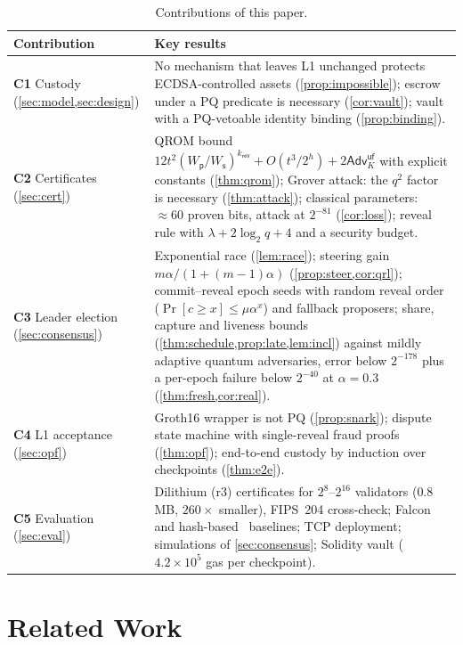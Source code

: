 \documentclass[10pt,journal,compsoc]{IEEEtran}
\theoremstyle{tplain}
\theoremstyle{tdef}
\theoremstyle{remark}
\newcommand{\Adv}{\mathsf{Adv}}
\newcommand{\Ws}{W_{\mathsf{s}}}
\newcommand{\Wp}{W_{\mathsf{p}}}
\newcommand{\kr}{k_{\mathsf{rev}}}
\begin{document}
\begin{table}[t]
\centering
\caption{Contributions of this paper.}
\label{tab:contrib}
\scriptsize
\setlength{\tabcolsep}{2.5pt}
\renewcommand{\arraystretch}{1.25}
\begin{tabular}{@{}>{\raggedright\arraybackslash}p{}>{\raggedright\arraybackslash}p{}@{}}
\toprule
Contribution & Key results\\
\midrule
\textbf{C1} Custody (\cref{sec:model,sec:design}) & No mechanism that leaves L1 unchanged protects ECDSA-controlled assets (\cref{prop:impossible}); escrow under a PQ predicate is necessary (\cref{cor:vault}); vault with a PQ-vetoable identity binding (\cref{prop:binding}).\\
\hline
\textbf{C2} Certificates (\cref{sec:cert}) & QROM bound $12t^2(\Wp/\Ws)^{\kr}+O(t^3/2^h)+2\Adv^{\mathsf{uf}}_K$ with explicit constants (\cref{thm:qrom}); Grover attack: the $q^2$ factor is necessary (\cref{thm:attack}); classical parameters: ${\approx}60$ proven bits, attack at $2^{-81}$ (\cref{cor:loss}); reveal rule with $\lambda+2\log_2 q+4$ and a security budget.\\
\hline
\textbf{C3} Leader election (\cref{sec:consensus}) & Exponential race (\cref{lem:race}); steering gain $m\alpha/(1+(m-1)\alpha)$ (\cref{prop:steer,cor:qrl}); commit--reveal epoch seeds with random reveal order ($\Pr[c\ge x]\le\mu\alpha^x$) and fallback proposers; share, capture and liveness bounds (\cref{thm:schedule,prop:late,lem:incl}) against mildly adaptive quantum adversaries, error below $2^{-178}$ plus a per-epoch failure below $2^{-40}$ at $\alpha=0.3$ (\cref{thm:fresh,cor:real}).\\
\hline
\textbf{C4} L1 acceptance (\cref{sec:opf}) & Groth16 wrapper is not PQ (\cref{prop:snark}); dispute state machine with single-reveal fraud proofs (\cref{thm:opf}); end-to-end custody by induction over checkpoints (\cref{thm:e2e}).\\
\hline
\textbf{C5} Evaluation (\cref{sec:eval}) & Dilithium (r3) certificates for $2^8$--$2^{16}$ validators ($0.8$\,MB, $260\times$ smaller), FIPS~204 cross-check; Falcon and hash-based~\cite{drake2025hashsig} baselines; TCP deployment; simulations of \cref{sec:consensus}; Solidity vault ($4.2\times10^5$ gas per checkpoint).\\
\bottomrule
\end{tabular}
\end{table}

\section{Related Work}\label{sec:related}
\end{document}
